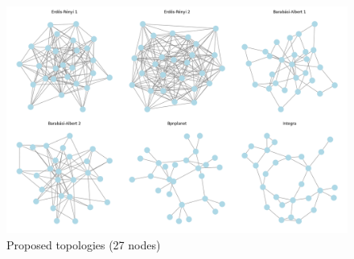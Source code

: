 \begin{figure}
    \centering
    \includegraphics[width=0.8\linewidth]{images/Topology set/27.png}
    \caption{Proposed topologies (27 nodes)}
    \label{fig:27_prop}
\end{figure}
